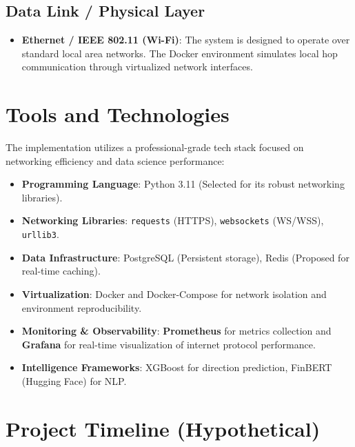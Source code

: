 \subsection{Data Link / Physical Layer}
\begin{itemize}
    \item \textbf{Ethernet / IEEE 802.11 (Wi-Fi)}: The system is designed to operate over standard local area networks. The Docker environment simulates local hop communication through virtualized network interfaces.
\end{itemize}

\section{Tools and Technologies}

The implementation utilizes a professional-grade tech stack focused on networking efficiency and data science performance:

\begin{itemize}
    \item \textbf{Programming Language}: Python 3.11 (Selected for its robust networking libraries).
    \item \textbf{Networking Libraries}: \texttt{requests} (HTTPS), \texttt{websockets} (WS/WSS), \texttt{urllib3}.
    \item \textbf{Data Infrastructure}: PostgreSQL (Persistent storage), Redis (Proposed for real-time caching).
    \item \textbf{Virtualization}: Docker and Docker-Compose for network isolation and environment reproducibility.
    \item \textbf{Monitoring \& Observability}: \textbf{Prometheus} for metrics collection and \textbf{Grafana} for real-time visualization of internet protocol performance.
    \item \textbf{Intelligence Frameworks}: XGBoost for direction prediction, FinBERT (Hugging Face) for NLP.
\end{itemize}

\section{Project Timeline (Hypothetical)}

